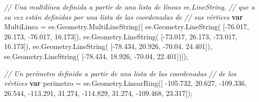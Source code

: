 \documentclass[
  12pt,
  letterpaper,
  twoside]{book}
\newenvironment{Shaded}{\begin{snugshade}}{\end{snugshade}}
\newcommand{\AttributeTok}[1]{\textcolor[rgb]{0.48,0.12,0.64}{#1}}
\newcommand{\CommentTok}[1]{\textcolor[rgb]{0.24,0.58,0.00}{\textit{#1}}}
\newcommand{\FloatTok}[1]{\textcolor[rgb]{0.28,0.53,0.93}{#1}}
\newcommand{\FunctionTok}[1]{\textcolor[rgb]{0.48,0.12,0.64}{#1}}
\newcommand{\KeywordTok}[1]{\textcolor[rgb]{0.00,0.00,0.00}{\textbf{#1}}}
\newcommand{\NormalTok}[1]{#1}
\newcommand{\OperatorTok}[1]{\textcolor[rgb]{0.00,0.00,0.00}{#1}}
\begin{document}
\begin{Shaded}
\begin{Highlighting}[]
\CommentTok{// Una multilínea definida a partir de una lista de líneas ee.LineString, }
\CommentTok{// que a su vez están definidas por una lista de las coordenadas de}
\CommentTok{// sus vértices}
\KeywordTok{var}\NormalTok{ MultiLinea }\OperatorTok{=}\NormalTok{ ee}\OperatorTok{.}\AttributeTok{Geometry}\OperatorTok{.}\FunctionTok{MultiLineString}\NormalTok{([ }
\NormalTok{   ee}\OperatorTok{.}\AttributeTok{Geometry}\OperatorTok{.}\FunctionTok{LineString}\NormalTok{(                     }
\NormalTok{     [}\OperatorTok{{-}}\FloatTok{76.017}\OperatorTok{,} \FloatTok{26.173}\OperatorTok{,} \OperatorTok{{-}}\FloatTok{76.017}\OperatorTok{,} \FloatTok{16.173}\NormalTok{])}\OperatorTok{,}      
\NormalTok{  ee}\OperatorTok{.}\AttributeTok{Geometry}\OperatorTok{.}\FunctionTok{LineString}\NormalTok{(                      }
\NormalTok{    [}\OperatorTok{{-}}\FloatTok{73.017}\OperatorTok{,} \FloatTok{26.173}\OperatorTok{,} \OperatorTok{{-}}\FloatTok{73.017}\OperatorTok{,} \FloatTok{16.173}\NormalTok{])}\OperatorTok{,}       
\NormalTok{  ee}\OperatorTok{.}\AttributeTok{Geometry}\OperatorTok{.}\FunctionTok{LineString}\NormalTok{(                      }
\NormalTok{    [}\OperatorTok{{-}}\FloatTok{78.434}\OperatorTok{,} \FloatTok{20.926}\OperatorTok{,} \OperatorTok{{-}}\FloatTok{70.04}\OperatorTok{,} \FloatTok{24.401}\NormalTok{])}\OperatorTok{,}
\NormalTok{  ee}\OperatorTok{.}\AttributeTok{Geometry}\OperatorTok{.}\FunctionTok{LineString}\NormalTok{(}
\NormalTok{    [}\OperatorTok{{-}}\FloatTok{78.434}\OperatorTok{,} \FloatTok{18.926}\OperatorTok{,} \OperatorTok{{-}}\FloatTok{70.04}\OperatorTok{,} \FloatTok{22.401}\NormalTok{])])}\OperatorTok{;}

\CommentTok{// Un perímetro definido a partir de una lista  de las coordenadas }
\CommentTok{// de los vértices}
\KeywordTok{var}\NormalTok{ perimetro }\OperatorTok{=}\NormalTok{ ee}\OperatorTok{.}\AttributeTok{Geometry}\OperatorTok{.}\FunctionTok{LinearRing}\NormalTok{([ }
  \OperatorTok{{-}}\FloatTok{105.732}\OperatorTok{,} \FloatTok{20.627}\OperatorTok{,}                      
  \OperatorTok{{-}}\FloatTok{109.336}\OperatorTok{,} \FloatTok{26.544}\OperatorTok{,}                      
  \OperatorTok{{-}}\FloatTok{113.291}\OperatorTok{,} \FloatTok{31.274}\OperatorTok{,}
  \OperatorTok{{-}}\FloatTok{114.829}\OperatorTok{,} \FloatTok{31.274}\OperatorTok{,}
  \OperatorTok{{-}}\FloatTok{109.468}\OperatorTok{,} \FloatTok{23.317}\NormalTok{])}\OperatorTok{;}
\end{Highlighting}
\end{Shaded}
\end{document}
